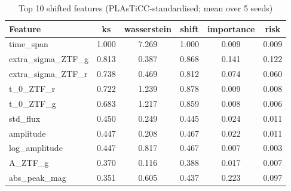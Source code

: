 \begin{table}
\centering
\caption{Top 10 shifted features (PLAsTiCC-standardised; mean over 5 seeds)}
\begin{tabular}{lccccc}
\hline
Feature & ks & wasserstein & shift & importance & risk \\
\hline
time\_span & 1.000 & 7.269 & 1.000 & 0.009 & 0.009 \\
extra\_sigma\_ZTF\_g & 0.813 & 0.387 & 0.868 & 0.141 & 0.122 \\
extra\_sigma\_ZTF\_r & 0.738 & 0.469 & 0.812 & 0.074 & 0.060 \\
t\_0\_ZTF\_r & 0.722 & 1.239 & 0.878 & 0.009 & 0.008 \\
t\_0\_ZTF\_g & 0.683 & 1.217 & 0.859 & 0.008 & 0.006 \\
std\_flux & 0.450 & 0.249 & 0.445 & 0.024 & 0.011 \\
amplitude & 0.447 & 0.208 & 0.467 & 0.022 & 0.011 \\
log\_amplitude & 0.447 & 0.817 & 0.467 & 0.007 & 0.003 \\
A\_ZTF\_g & 0.370 & 0.116 & 0.388 & 0.017 & 0.007 \\
abs\_peak\_mag & 0.351 & 0.605 & 0.437 & 0.223 & 0.097 \\
\hline
\end{tabular}
\end{table}
